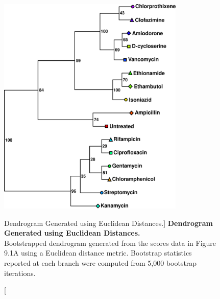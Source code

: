 \begin{figure}
\includegraphics[width=3.5in]{figs/utils/03-tree.png}
\caption
      [Dendrogram Generated using Euclidean Distances.]{
  {\bf Dendrogram Generated using Euclidean Distances.}
  \\
  Bootstrapped dendrogram generated from the scores data in Figure 9.1A using
  a Euclidean distance metric. Bootstrap statistics reported at each branch
  were computed from 5,000 bootstrap iterations.
}
\end{figure}

